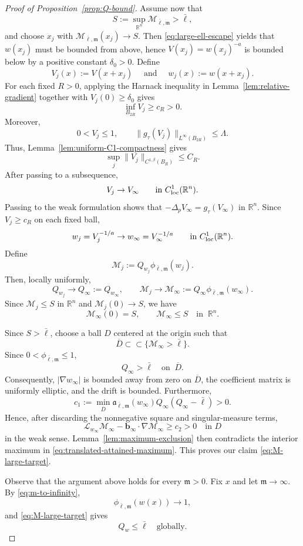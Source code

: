 \documentclass[reqno,12pt]{amsart}
\numberwithin{equation}{section}
\theoremstyle{remark}
\newcommand{\R}{\mathbb R}
\newcommand{\Lscr}{\mathscr L}
\newcommand{\Mscr}{\mathscr M}
\begin{document}
\begin{proof}[Proof of Proposition~\ref{prop:Q-bound}]
Assume now that
$$S:=\sup_{\R^n}\Mscr_{\bar\ell,\mathfrak m}>\bar\ell,$$
and choose
$x_j$ with $\Mscr_{\bar\ell,\mathfrak m}(x_j)\to S$.  Then 
\eqref{eq:large-ell-escape} yields that $w(x_j)$ must be bounded from above, hence $V(x_j)=w(x_j)^{-a}$ is bounded below by a positive constant $\delta_0>0$.  Define
$$
V_j(x):=V(x+x_j) \quad \text{ and } \quad w_j(x):=w(x+x_j).
$$
For each fixed $R>0$, applying the  Harnack inequality in Lemma~\ref{lem:relative-gradient} together with $V_j(0)\ge\delta_0$ gives
$$
\inf_{B_{2R}}V_j\ge c_R>0.
$$
Moreover,
$$
0<V_j\le1, \qquad
\|g_\tau(V_j)\|_{L^\infty(B_{2R})}\le\Lambda.
$$
Thus, Lemma~\ref{lem:uniform-C1-compactness}  gives
$$
\sup_j\|V_j\|_{C^{1,\beta}(B_R)}\le C_R.
$$
After passing to a  subsequence,
$$
V_j\to V_\infty\qquad\text{in }C^1_{\rm loc}(\R^n).
$$
Passing to the weak formulation shows that
$-\Delta_pV_\infty=g_\tau(V_\infty)$ in $\R^n$.
Since $V_j\ge c_R$ on each fixed ball,
$$
w_j=V_j^{-1/a}\to w_\infty=V_\infty^{-1/a} \qquad\text{in }C^1_{\rm loc}(\R^n).
$$
Define
$$
\mathscr M_j:=Q_{w_j}\phi_{\bar\ell,\mathfrak m}(w_j).
$$
Then, locally uniformly,
$$
Q_{w_j}\to Q_\infty:=Q_{w_\infty},
\qquad \mathscr M_j\to \mathscr M_\infty
:= Q_\infty\phi_{\bar\ell,\mathfrak m}(w_\infty).
$$
Since $\mathscr M_j\le S$ in $\R^n$ and
$\mathscr M_j(0)\to S$, we have
\begin{equation}\label{eq:translated-attained-maximum}
\mathscr M_\infty(0)=S, \qquad \mathscr M_\infty\le S
\quad\text{in }\ \R^n.
\end{equation}

Since $S>\bar\ell$, choose a ball $D$ centered at the origin such that
$$
\overline D\subset \subset \{\mathscr M_\infty>\bar\ell\}.
$$
Since $0<\phi_{\bar\ell,\mathfrak m}\le1$,
$$
Q_\infty>\bar\ell \quad\text{on }\ \overline D.
$$
Consequently, $|\nabla w_\infty|$ is bounded away from zero on
$\overline D$, the coefficient matrix is uniformly elliptic, and the
drift is bounded. Furthermore,
$$
c_1:= \min_{\overline D} \mathfrak a_{\bar\ell,\mathfrak m}(w_\infty) Q_\infty(Q_\infty-\bar\ell)>0.
$$
Hence, after discarding the nonnegative square and singular-measure
terms,
$$
\Lscr_{w_\infty}\mathscr M_\infty -\mathbf b_\infty\cdot\nabla\mathscr M_\infty
\ge c_2>0  \quad\text{in }D
$$
in the weak sense. Lemma~\ref{lem:maximum-exclusion} then contradicts
the interior maximum in
\eqref{eq:translated-attained-maximum}. This proves our claim
\eqref{eq:M-large-target}.

Observe that the argument above holds for every $\mathfrak m>0$.  Fix $x$ and let
$\mathfrak m\to\infty$.  By \eqref{eq:m-to-infinity},
$$\phi_{\bar\ell,\mathfrak m}(w(x))\to 1,$$ and
\eqref{eq:M-large-target} gives
\begin{equation}\label{eq:coarse-Q-bound}
Q_w\le\bar\ell\quad\text{globally}.
\end{equation}


\end{proof}
\end{document}
